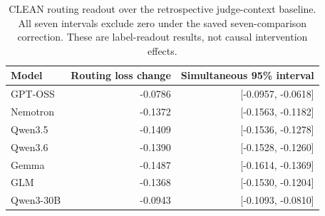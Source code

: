 \begin{table}[t]
\centering
\begin{tabular}{lrr}
\toprule
Model & Routing loss change & Simultaneous 95\% interval \\
\midrule
GPT-OSS & -0.0786 & [-0.0957, -0.0618] \\
Nemotron & -0.1372 & [-0.1563, -0.1182] \\
Qwen3.5 & -0.1409 & [-0.1536, -0.1278] \\
Qwen3.6 & -0.1390 & [-0.1528, -0.1260] \\
Gemma & -0.1487 & [-0.1614, -0.1369] \\
GLM & -0.1368 & [-0.1530, -0.1204] \\
Qwen3-30B & -0.0943 & [-0.1093, -0.0810] \\
\bottomrule
\end{tabular}
\caption{CLEAN routing readout over the retrospective judge-context baseline. All seven intervals exclude zero under the saved seven-comparison correction. These are label-readout results, not causal intervention effects.}
\label{tab:seven-readout-current}
\end{table}
